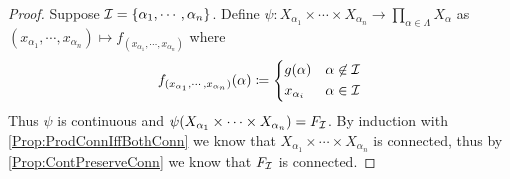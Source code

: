 \documentclass[screen]{techreport}
\numberwithin{equation}{section}
\begin{document}
\begin{proof}
	Suppose $\mathcal{I} = \{ \alpha_1,\cdots,\alpha_n\}$.
	Define $\psi : X_{\alpha_1} \times \cdots \times X_{\alpha_n} \to \prod_{\alpha \in \Lambda} X_\alpha$ as $(x_{\alpha_1},\cdots,x_{\alpha_n}) \mapsto f_{(x_{\alpha_1},\cdots,x_{\alpha_n})}$ where
	\[
	f_{(x_{\alpha_1},\cdots,x_{\alpha_n})}(\alpha) \coloneqq \begin{dcases}
 		g(\alpha) & \alpha \not\in \mathcal{I} \\
 		x_{\alpha_i} & \alpha \in \mathcal{I}
 	\end{dcases}
	\]
	Thus $\psi$ is continuous and $\psi(X_{\alpha_1} \times \cdots \times X_{\alpha_n}) = F_{\mathcal{I}}$.
	By induction with \cref{Prop:ProdConnIffBothConn} we know that $X_{\alpha_1} \times \cdots \times X_{\alpha_n}$ is connected, thus by \cref{Prop:ContPreserveConn} we know that $F_{\mathcal{I}}$ is connected.
\end{proof}
\end{document}
